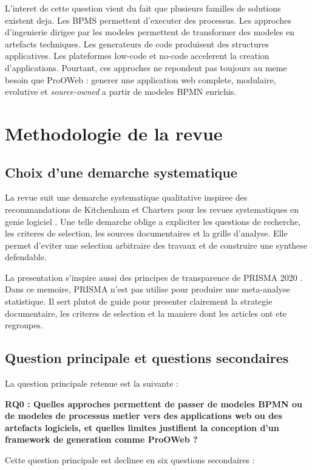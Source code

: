 \documentclass[12pt,a4paper]{article}
\begin{document}
L'interet de cette question vient du fait que plusieurs familles de solutions existent deja. Les BPMS permettent d'executer des processus. Les approches d'ingenierie dirigee par les modeles permettent de transformer des modeles en artefacts techniques. Les generateurs de code produisent des structures applicatives. Les plateformes low-code et no-code accelerent la creation d'applications. Pourtant, ces approches ne repondent pas toujours au meme besoin que ProOWeb : generer une application web complete, modulaire, evolutive et \textit{source-owned} a partir de modeles BPMN enrichis.

\section{Methodologie de la revue}

\subsection{Choix d'une demarche systematique}

La revue suit une demarche systematique qualitative inspiree des recommandations de Kitchenham et Charters pour les revues systematiques en genie logiciel \cite{kitchenham2007}. Une telle demarche oblige a expliciter les questions de recherche, les criteres de selection, les sources documentaires et la grille d'analyse. Elle permet d'eviter une selection arbitraire des travaux et de construire une synthese defendable.

La presentation s'inspire aussi des principes de transparence de PRISMA 2020 \cite{prisma2020}. Dans ce memoire, PRISMA n'est pas utilise pour produire une meta-analyse statistique. Il sert plutot de guide pour presenter clairement la strategie documentaire, les criteres de selection et la maniere dont les articles ont ete regroupes.

\subsection{Question principale et questions secondaires}

La question principale retenue est la suivante :

\textbf{RQ0 : Quelles approches permettent de passer de modeles BPMN ou de modeles de processus metier vers des applications web ou des artefacts logiciels, et quelles limites justifient la conception d'un framework de generation comme ProOWeb ?}

Cette question principale est declinee en six questions secondaires :
\end{document}
